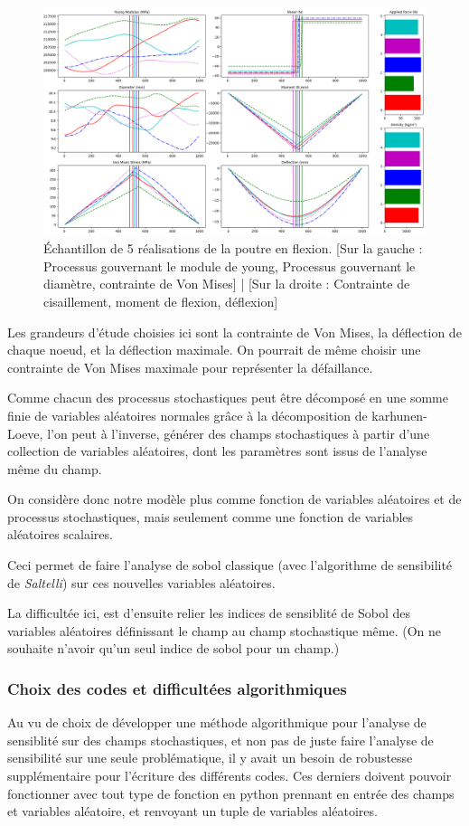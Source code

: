 \documentclass[a4paper,10pt]{article}
\begin{document}
\begin{figure}[H]
   \centering   
   \includegraphics[width=\linewidth]{beam_experience.png}
      \caption{Échantillon de 5 réalisations de la poutre en flexion. [Sur la gauche : Processus gouvernant le module de young, Processus gouvernant le diamètre, contrainte de Von Mises] | [Sur la droite : Contrainte de cisaillement, moment de flexion, déflexion] }
         \label{beamExperience}
\end{figure}

Les grandeurs d'étude choisies ici sont la contrainte de Von Mises, la déflection de chaque noeud, et la déflection maximale. On pourrait de même choisir une contrainte de Von Mises maximale pour représenter la défaillance. 

Comme chacun des processus stochastiques peut être décomposé en une somme finie de variables aléatoires normales grâce à la décomposition de karhunen-Loeve, l'on peut à l'inverse, générer des champs stochastiques à partir d'une collection de variables aléatoires, dont les paramètres sont issus de l'analyse même du champ.

On considère donc notre modèle plus comme fonction de variables aléatoires et de processus stochastiques, mais seulement comme une fonction de variables aléatoires scalaires.

Ceci permet de faire l'analyse de sobol classique (avec l'algorithme de sensibilité de \textit{Saltelli}) sur ces nouvelles variables aléatoires.

La difficultée ici, est d'ensuite relier les indices de sensiblité de Sobol des variables aléatoires définissant le champ au champ stochastique même. (On ne souhaite n'avoir qu'un seul indice de sobol pour un champ.) 

\subsubsection{Choix des codes et difficultées algorithmiques}
Au vu de choix de développer une méthode algorithmique pour l'analyse de sensiblité sur des champs stochastiques, et non pas de juste faire l'analyse de sensibilité sur une seule problématique, il y avait un besoin de robustesse supplémentaire pour l'écriture des différents codes. Ces derniers doivent pouvoir fonctionner avec tout type de fonction en python prennant en entrée des champs et variables aléatoire, et renvoyant un tuple de variables aléatoires. 
\end{document}
